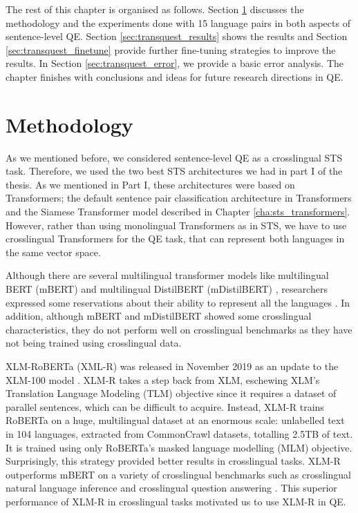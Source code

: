 The rest of this chapter is organised as follows. Section \ref{sec:transquest_method} discusses the methodology and the experiments done with 15 language pairs in both aspects of sentence-level QE.  Section \ref{sec:transquest_results} shows the results and Section \ref{sec:transquest_finetune} provide further fine-tuning strategies to improve the results. In Section \ref{sec:transquest_error}, we provide a basic error analysis. The chapter finishes with conclusions and ideas for future research directions in QE.

\section{Methodology}
\label{sec:transquest_method}
As we mentioned before, we considered sentence-level QE as a crosslingual STS task. Therefore, we used the two best STS architectures we had in part I of the thesis. As we mentioned in Part I, these architectures were based on Transformers; the default sentence pair classification architecture in Transformers and the Siamese Transformer model described in Chapter \ref{cha:sts_transformers}. However, rather than using monolingual Transformers as in STS, we have to use crosslingual Transformers for the QE task, that can represent both languages in the same vector space.

Although there are several multilingual transformer models like multilingual BERT (mBERT) \cite{devlin-etal-2019-bert} and multilingual DistilBERT (mDistilBERT) \cite{Sanh2019DistilBERTAD}, researchers expressed some reservations about their ability to represent all the languages \cite{pires-etal-2019-multilingual}. In addition, although mBERT and mDistilBERT showed some crosslingual characteristics, they do not perform well on crosslingual benchmarks \cite{karthikeyan2020cross} as they have not being trained using crosslingual data. 

XLM-RoBERTa (XML-R) was released in November 2019 \cite{conneau-etal-2020-unsupervised} as an update to the XLM-100 model \cite{lample2019cross}. XLM-R takes a step back from XLM, eschewing XLM's Translation Language Modeling (TLM) objective since it requires a dataset of parallel sentences, which can be difficult to acquire. Instead, XLM-R trains RoBERTa\cite{liu2019roberta} on a huge, multilingual dataset at an enormous scale: unlabelled text in 104 languages, extracted from CommonCrawl datasets, totalling 2.5TB of text. It is trained using only RoBERTa's \cite{liu2019roberta} masked language modelling (MLM) objective. Surprisingly, this strategy provided better results in crosslingual tasks. XLM-R outperforms mBERT on a variety of crosslingual benchmarks such as crosslingual natural language inference and crosslingual question answering \cite{conneau-etal-2020-unsupervised}. This superior performance of XLM-R in crosslingual tasks motivated us to use XLM-R in QE. 

